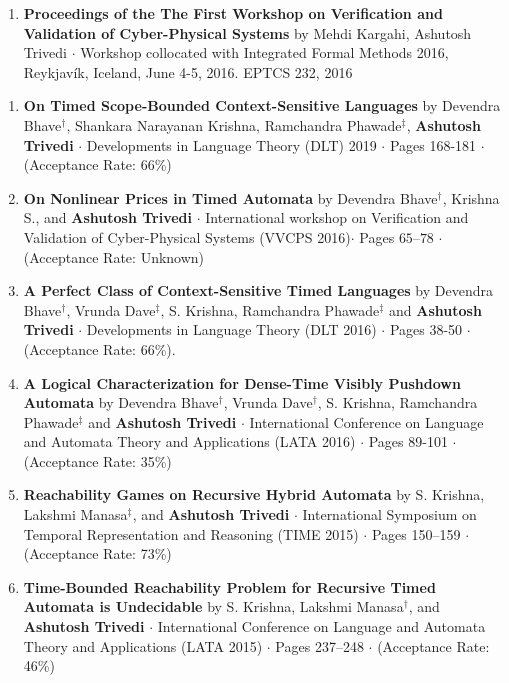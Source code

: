 \documentclass{article}
\begin{document}
\vspace{1em}
\begin{enumerate}
  \item 
  {\bf Proceedings of the The First Workshop on Verification and Validation of
  Cyber-Physical Systems} by Mehdi Kargahi, Ashutosh Trivedi $\cdot$ Workshop
  collocated with Integrated Formal Methods 2016, Reykjavík, Iceland, June 4-5,
  2016. EPTCS 232, 2016 
\end{enumerate}

\vspace{1em}
\begin{enumerate}
     \item
  {\bf  On Timed Scope-Bounded Context-Sensitive Languages} by  Devendra Bhave${}^{\dag}$,
  Shankara Narayanan Krishna, Ramchandra Phawade${}^{\ddag}$, {\bf Ashutosh Trivedi} $\cdot$
  Developments in Language Theory (DLT) 2019 $\cdot$ Pages 168-181 $\cdot$ (Acceptance Rate: 66\%)
  \item
  {\bf On Nonlinear Prices in Timed Automata} by
  Devendra Bhave${}^{\dag}$, Krishna S., and {\bf Ashutosh Trivedi} $\cdot$ International workshop on
  Verification and Validation of Cyber-Physical Systems (VVCPS 2016)$\cdot$
  Pages $65$--$78$ $\cdot$ (Acceptance Rate: Unknown)

  \item
    {\bf A Perfect Class of Context-Sensitive Timed Languages} 
    by Devendra Bhave${}^{\dag}$, Vrunda Dave${}^{\ddag}$, S. Krishna, Ramchandra
    Phawade${}^{\ddag}$ and {\bf Ashutosh Trivedi} $\cdot$ Developments in Language
    Theory (DLT 2016) $\cdot$ Pages 38-50 $\cdot$ (Acceptance Rate: 66\%).
  \item
    {\bf A Logical Characterization for Dense-Time Visibly Pushdown Automata}
    by Devendra Bhave${}^{\dag}$, Vrunda Dave${}^{\dag}$, S. Krishna, Ramchandra
    Phawade${}^{\ddag}$ and {\bf Ashutosh Trivedi} $\cdot$  
    International Conference on
    Language and Automata Theory and Applications (LATA 2016) $\cdot$ Pages
    89-101 $\cdot$ (Acceptance Rate: 35\%)
    
\item
  {\bf Reachability Games on Recursive Hybrid Automata}
  by S. Krishna, Lakshmi Manasa${}^{\ddag}$, and {\bf Ashutosh Trivedi} $\cdot$ International
  Symposium on Temporal Representation and Reasoning (TIME 2015) $\cdot$ Pages
  150--159 $\cdot$ (Acceptance Rate: 73\%)
\item
  {\bf Time-Bounded Reachability Problem for Recursive Timed Automata is
    Undecidable} by S. Krishna, Lakshmi Manasa${}^{\dag}$, and {\bf Ashutosh Trivedi} $\cdot$  
  International Conference on Language and Automata
  Theory and Applications (LATA 2015) $\cdot$ Pages 237--248 $\cdot$ (Acceptance
  Rate: 46\%)


\end{enumerate}
\end{document}
